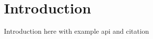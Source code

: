 \chapter{Introduction}
\label{chap:introduction}

Introduction here with example \gls{api} and citation~\cite{Ran12}
